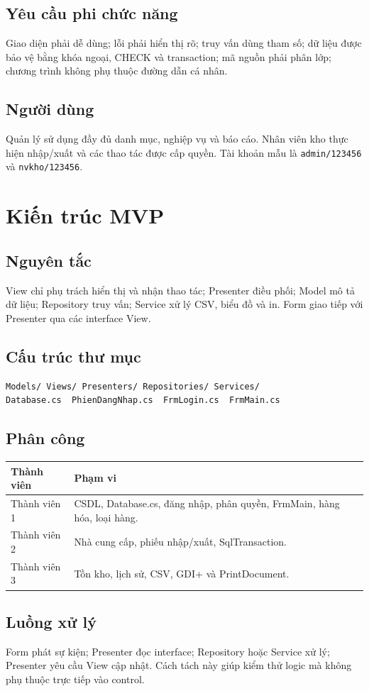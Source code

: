 \documentclass[12pt,a4paper]{report}
\newcommand{\code}[1]{\texttt{#1}}
\begin{document}
\section{Yêu cầu phi chức năng}
Giao diện phải dễ dùng; lỗi phải hiển thị rõ; truy vấn dùng tham số; dữ liệu được
bảo vệ bằng khóa ngoại, CHECK và transaction; mã nguồn phải phân lớp; chương trình
không phụ thuộc đường dẫn cá nhân.
\section{Người dùng}
Quản lý sử dụng đầy đủ danh mục, nghiệp vụ và báo cáo. Nhân viên kho thực hiện
nhập/xuất và các thao tác được cấp quyền. Tài khoản mẫu là \code{admin/123456}
và \code{nvkho/123456}.

\chapter{Kiến trúc MVP}
\section{Nguyên tắc}
View chỉ phụ trách hiển thị và nhận thao tác; Presenter điều phối; Model mô tả
dữ liệu; Repository truy vấn; Service xử lý CSV, biểu đồ và in. Form giao tiếp
với Presenter qua các interface View.
\section{Cấu trúc thư mục}
\begin{verbatim}
Models/ Views/ Presenters/ Repositories/ Services/
Database.cs  PhienDangNhap.cs  FrmLogin.cs  FrmMain.cs
\end{verbatim}
\section{Phân công}
\begin{longtable}{p{}p{}}
\toprule Thành viên & Phạm vi\\\midrule
Thành viên 1 & CSDL, Database.cs, đăng nhập, phân quyền, FrmMain, hàng hóa, loại hàng.\\
Thành viên 2 & Nhà cung cấp, phiếu nhập/xuất, SqlTransaction.\\
Thành viên 3 & Tồn kho, lịch sử, CSV, GDI+ và PrintDocument.\\
\bottomrule
\end{longtable}
\section{Luồng xử lý}
Form phát sự kiện; Presenter đọc interface; Repository hoặc Service xử lý;
Presenter yêu cầu View cập nhật. Cách tách này giúp kiểm thử logic mà không
phụ thuộc trực tiếp vào control.
\end{document}

